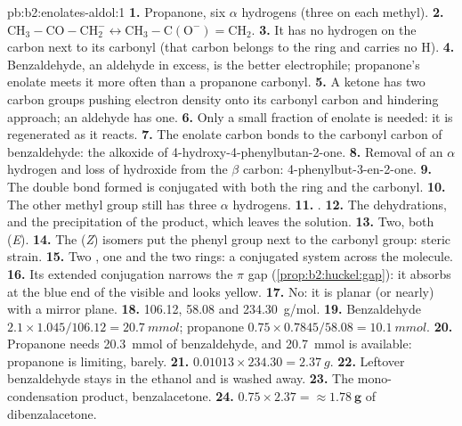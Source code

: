 \begin{solution}{pb:b2:enolates-aldol:1}
\textbf{1.} Propanone, six $\alpha$ hydrogens (three on each methyl).
\textbf{2.} $\mathrm{CH_3{-}CO{-}CH_2^-} \leftrightarrow \mathrm{CH_3{-}C(O^-){=}CH_2}$.
\textbf{3.} It has no hydrogen on the carbon next to its carbonyl (that carbon belongs to the ring and
carries no H).
\textbf{4.} Benzaldehyde, an aldehyde in excess, is the better electrophile; propanone's enolate meets it
more often than a propanone carbonyl.
\textbf{5.} A ketone has two carbon groups pushing electron density onto its carbonyl carbon and
hindering approach; an aldehyde has one.
\textbf{6.} Only a small fraction of enolate is needed: it is regenerated as it reacts.
\textbf{7.} The enolate carbon bonds to the carbonyl carbon of benzaldehyde: the alkoxide of
4-hydroxy-4-phenylbutan-2-one.
\textbf{8.} Removal of an $\alpha$ hydrogen and loss of hydroxide from the $\beta$ carbon: 4-phenylbut-3-en-2-one.
\textbf{9.} The double bond formed is conjugated with both the ring and the carbonyl.
\textbf{10.} The other methyl group still has three $\alpha$ hydrogens.
\textbf{11.} .
\textbf{12.} The dehydrations, and the precipitation of the product, which leaves the solution.
\textbf{13.} Two, both (\textit{E}).
\textbf{14.} The (\textit{Z}) isomers put the phenyl group next to the carbonyl group: steric strain.
\textbf{15.} Two , one  and the two rings: a conjugated system across the molecule.
\textbf{16.} Its extended conjugation narrows the $\pi$ gap (\cref{prop:b2:huckel:gap}): it absorbs at the
blue end of the visible and looks yellow.
\textbf{17.} No: it is planar (or nearly) with a mirror plane.
\textbf{18.} 106.12, 58.08 and \qty{234.30}{g/mol}.
\textbf{19.} Benzaldehyde $2.1 \times 1.045/106.12 = \qty{20.7}{mmol}$; propanone $0.75 \times
0.7845/58.08 = \qty{10.1}{mmol}$.
\textbf{20.} Propanone needs \qty{20.3}{mmol} of benzaldehyde, and \qty{20.7}{mmol} is available:
propanone is limiting, barely.
\textbf{21.} $0.01013 \times 234.30 = \qty{2.37}{g}$.
\textbf{22.} Leftover benzaldehyde stays in the ethanol and is washed away.
\textbf{23.} The mono-condensation product, benzalacetone.
\textbf{24.} $0.75 \times 2.37 = \boldsymbol{\approx \qty{1.78}{g}}$ of dibenzalacetone.
\end{solution}
